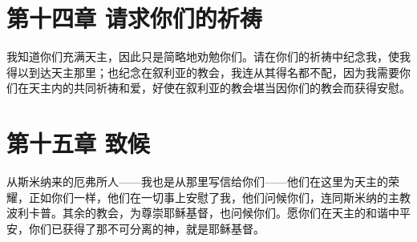 
\section{第十四章 请求你们的祈祷}

我知道你们充满天主，因此只是简略地劝勉你们。请在你们的祈祷中纪念我，使我得以到达天主那里；也纪念在叙利亚的教会，我连从其得名都不配，因为我需要你们在天主内的共同祈祷和爱，好使在叙利亚的教会堪当因你们的教会而获得安慰。\par


\section{第十五章 致候}

从斯米纳来的厄弗所人——我也是从那里写信给你们——他们在这里为天主的荣耀，正如你们一样，他们在一切事上安慰了我，他们问候你们，连同斯米纳的主教波利卡普。其余的教会，为尊崇耶稣基督，也问候你们。愿你们在天主的和谐中平安，你们已获得了那不可分离的神，就是耶稣基督。\par


